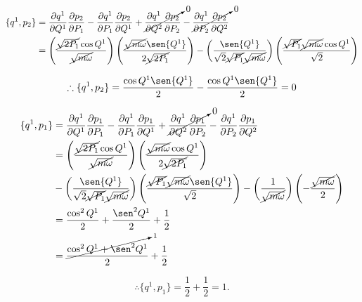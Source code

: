 \documentclass[a4paper,10pt]{article}
\numberwithin{equation}{section}
\begin{document}
\begin{align*}
 \{q^1,p_2\} &= \frac{\partial q^1}{\partial Q^1}\frac{\partial p_2}{\partial P_1} - 
 \frac{\partial q^1}{\partial P_1}\frac{\partial p_2}{\partial Q^1} + 
 \cancelto{0}{\frac{\partial q^1}{\partial Q^2}\frac{\partial p_2}{\partial P_2}} -
 \cancelto{0}{\frac{\partial q^1}{\partial P_2}\frac{\partial p_2}{\partial Q^2}} \\
 &= \left(\frac{\cancel{\sqrt{2P_1}}\cos{Q^1}}{\cancel{\sqrt{m\omega}}} \right)
 \left(\frac{\cancel{\sqrt{m\omega}}\sen{Q^1}}{2\cancel{\sqrt{2P_1}}} \right) - 
 \left(\frac{\sen{Q^1}}{\sqrt{2}\cancel{\sqrt{P_1}}\cancel{\sqrt{m\omega}}} \right)
 \left(\frac{\cancel{\sqrt{P_1}}\cancel{\sqrt{m\omega}}\cos{Q^1}}{\sqrt{2}}\right)
\end{align*}

\begin{equation}
 \therefore  \{q^1,p_2\} = \frac{\cos{Q^1}\sen{Q^1}}{2} - \frac{\cos{Q^1}\sen{Q^1}}{2} = 0
\end{equation}

\begin{align*}
 \{q^1,p_1\} &= \frac{\partial q^1}{\partial Q^1}\frac{\partial p_1}{\partial P_1} - 
 \frac{\partial q^1}{\partial P_1}\frac{\partial p_1}{\partial Q^1} + 
 \cancelto{0}{\frac{\partial q^1}{\partial Q^2}\frac{\partial p_1}{\partial P_2}} -
 \frac{\partial q^1}{\partial P_2}\frac{\partial p_1}{\partial Q^2} \\
 &= \left(\frac{\cancel{\sqrt{2P_1}}\cos{Q^1}}{\cancel{\sqrt{m\omega}}} \right)
 \left(\frac{\cancel{\sqrt{m\omega}} \cos{Q^1}}{2\cancel{\sqrt{2P_1}}}\right) \\
 &- \left(\frac{\sen{Q^1}}{\sqrt{2}\cancel{\sqrt{P_1}}\cancel{\sqrt{m\omega}}} \right)
 \left(\frac{\cancel{\sqrt{P_1}}\cancel{\sqrt{m\omega}}\sen{Q^1}}{\sqrt{2}} \right) -
 \left(\frac{1}{\cancel{\sqrt{m\omega}}} \right) \left(- \frac{\cancel{\sqrt{m\omega}}}{2} \right) \\ 
 &= \frac{\cos^2{Q^1}}{2} + \frac{\sen^2{Q^1}}{2} + \frac{1}{2} \\
 &= \frac{\cancelto{1}{\cos^2{Q^1} + \sen^2{Q^1}}}{2} + \frac{1}{2}
\end{align*}

\begin{equation}
 \therefore \{q^1,p_1\} = \frac{1}{2} + \frac{1}{2} = 1.
\end{equation}
\end{document}
